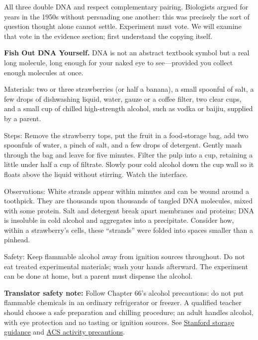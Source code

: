 All three double DNA and respect complementary pairing. Biologists argued for years in the 1950s without persuading one another: this was precisely the sort of question thought alone cannot settle. Experiment must vote. We will examine that vote in the evidence section; first understand the copying itself.

\begin{shiyan}
\textbf{Fish Out DNA Yourself.} DNA is not an abstract textbook symbol but a real long molecule, long enough for your naked eye to see---provided you collect enough molecules at once.

Materials: two or three strawberries (or half a banana), a small spoonful of salt, a few drops of dishwashing liquid, water, gauze or a coffee filter, two clear cups, and a small cup of chilled high-strength alcohol, such as vodka or baijiu, supplied by a parent.

Steps: Remove the strawberry tops, put the fruit in a food-storage bag, add two spoonfuls of water, a pinch of salt, and a few drops of detergent. Gently mash through the bag and leave for five minutes. Filter the pulp into a cup, retaining a little under half a cup of filtrate. Slowly pour cold alcohol down the cup wall so it floats above the liquid without stirring. Watch the interface.

Observations: White strands appear within minutes and can be wound around a toothpick. They are thousands upon thousands of tangled DNA molecules, mixed with some protein. Salt and detergent break apart membranes and proteins; DNA is insoluble in cold alcohol and aggregates into a precipitate. Consider how, within a strawberry's cells, these ``strands'' were folded into spaces smaller than a pinhead.

Safety: Keep flammable alcohol away from ignition sources throughout. Do not eat treated experimental materials; wash your hands afterward. The experiment can be done at home, but a parent must dispense the alcohol.
\end{shiyan}

\textbf{Translator safety note:} Follow Chapter 66's alcohol precautions: do not put flammable chemicals in an ordinary refrigerator or freezer. A qualified teacher should choose a safe preparation and chilling procedure; an adult handles alcohol, with eye protection and no tasting or ignition sources. See \href{https://ehs.stanford.edu/wp-content/uploads/Lab-Compliance-Cheat-Sheet.pdf}{Stanford storage guidance} and \href{https://www.acs.org/education/celebrating-chemistry-editions/2024-ccew/science-safety-tips.html}{ACS activity precautions}.

